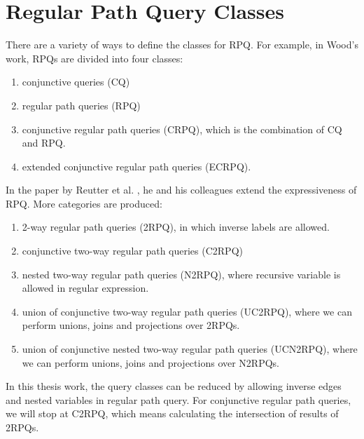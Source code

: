 \section{Regular Path Query Classes}
There are a variety of ways to define the classes for RPQ. For example, in Wood's work\cite{wood2012query}, RPQs are divided into four classes:
\begin{enumerate}
\item conjunctive queries (CQ)
\item regular path queries (RPQ)
\item conjunctive regular path queries (CRPQ), which is the combination of CQ and RPQ.
\item extended conjunctive regular path queries (ECRPQ).
\end{enumerate}
In the paper by Reutter et al. \cite{reutter2015regular}, he and his colleagues extend the expressiveness of RPQ. More categories are produced:
\begin{enumerate}
\item 2-way regular path queries (2RPQ), in which inverse labels are allowed.
\item conjunctive two-way regular path queries (C2RPQ)
\item nested two-way regular path queries (N2RPQ), where recursive variable is allowed in regular expression.
\item union of conjunctive two-way regular path queries (UC2RPQ), where we can perform unions, joins and projections over 2RPQs.
\item union of conjunctive nested two-way regular path queries (UCN2RPQ), where we can perform unions, joins and projections over N2RPQs. 
\end{enumerate}
In this thesis work, the query classes can be reduced by allowing inverse edges and nested variables in regular path query. For conjunctive regular path queries, we will stop at C2RPQ, which means calculating the intersection of results of 2RPQs.
